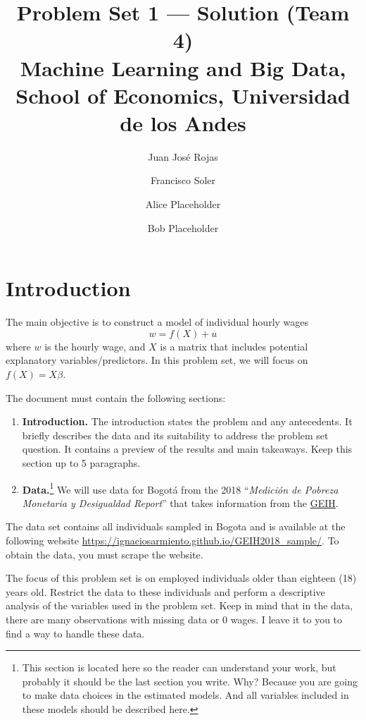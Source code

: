 \documentclass[12pt,a4paper,onecolumn]{article}
\title{\textbf{Problem Set 1 --- Solution (Team 4)}\\
\large Machine Learning and Big Data, School of Economics, Universidad de los Andes}
\author{Juan Jos\'e Rojas}
\author{Francisco Soler}
\author{Alice Placeholder}
\author{Bob Placeholder}
\date{}
\begin{document}
\maketitle
\thispagestyle{empty}
\onehalfspacing

\section{Introduction}

The main objective is to construct a model of individual hourly wages
\begin{equation}
w = f(X) + u
\end{equation}
where $w$ is the hourly wage, and $X$ is a matrix that includes potential explanatory variables/predictors. In this problem set, we will focus on $f(X)=X\beta$.

The document must contain the following sections:

\begin{enumerate}[1.]
  \item \textbf{Introduction.} The introduction states the problem and any antecedents. It briefly describes the data and its suitability to address the problem set question. It contains a preview of the results and main takeaways. Keep this section up to 5 paragraphs.

  \item \textbf{Data.}\footnote{This section is located here so the reader can understand your work, but probably it should be the last section you write. Why? Because you are going to make data choices in the estimated models. And all variables included in these models should be described here.} We will use data for Bogotá from the 2018 ``\emph{Medición de Pobreza Monetaria y Desigualdad Report}'' that takes information from the \href{https://www.dane.gov.co/}{GEIH}.
\end{enumerate}

\medskip

\noindent The data set contains all individuals sampled in Bogota and is available at the following website \href{https://ignaciosarmiento.github.io/GEIH2018_sample/}{https://ignaciosarmiento.github.io/GEIH2018\_sample/}. To obtain the data, you must scrape the website.

The focus of this problem set is on employed individuals older than eighteen (18) years old. Restrict the data to these individuals and perform a descriptive analysis of the variables used in the problem set. Keep in mind that in the data, there are many observations with missing data or 0 wages. I leave it to you to find a way to handle these data.
\end{document}
